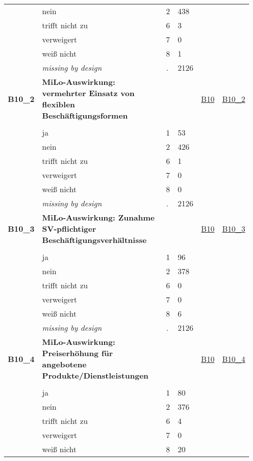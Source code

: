 \begin{longtable}{| L{2.45cm} | L{6cm} | C{1.5cm} | R{1cm} | C{2.25cm} | C{2.25cm} |}
   & nein & 2 & 438 &  &  \\ 
   & trifft nicht zu & 6 & 3 &  &  \\ 
   & verweigert & 7 & 0 &  &  \\ 
   & weiß nicht & 8 & 1 &  &  \\ 
   & \textit{missing by design} & \textit{.} & 2126 &  &  \\ 
   \midrule
\textbf{B10\_2}\label{var:B10:2} & \textbf{MiLo-Auswirkung: vermehrter Einsatz von flexiblen Beschäftigungsformen} &  &  & \hyperref[B10]{B10} & \hyperref[var:suf:B10:2]{B10\_2} \\ 
   &  &  &  &  &  \\ 
   & ja & 1 & 53 &  &  \\ 
   & nein & 2 & 426 &  &  \\ 
   & trifft nicht zu & 6 & 1 &  &  \\ 
   & verweigert & 7 & 0 &  &  \\ 
   & weiß nicht & 8 & 0 &  &  \\ 
   & \textit{missing by design} & \textit{.} & 2126 &  &  \\ 
   \midrule
\textbf{B10\_3}\label{var:B10:3} & \textbf{MiLo-Auswirkung: Zunahme SV-pflichtiger Beschäftigungsverhältnisse} &  &  & \hyperref[B10]{B10} & \hyperref[var:suf:B10:3]{B10\_3} \\ 
   &  &  &  &  &  \\ 
   & ja & 1 & 96 &  &  \\ 
   & nein & 2 & 378 &  &  \\ 
   & trifft nicht zu & 6 & 0 &  &  \\ 
   & verweigert & 7 & 0 &  &  \\ 
   & weiß nicht & 8 & 6 &  &  \\ 
   & \textit{missing by design} & \textit{.} & 2126 &  &  \\ 
   \midrule
\textbf{B10\_4}\label{var:B10:4} & \textbf{MiLo-Auswirkung: Preiserhöhung für angebotene Produkte/Dienstleistungen} &  &  & \hyperref[B10]{B10} & \hyperref[var:suf:B10:4]{B10\_4} \\ 
   &  &  &  &  &  \\ 
   & ja & 1 & 80 &  &  \\ 
   & nein & 2 & 376 &  &  \\ 
   & trifft nicht zu & 6 & 4 &  &  \\ 
   & verweigert & 7 & 0 &  &  \\ 
   & weiß nicht & 8 & 20 &  &  \\ 

\end{longtable}
